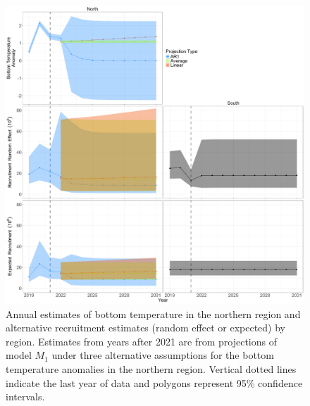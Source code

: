 \documentclass[
]{article}
\begin{document}
\begin{figure}

{\centering \includegraphics[height=0.95\textheight]{proj_ecov_Recruit_results} 

}

\caption{Annual estimates of bottom temperature in the northern region and alternative recruitment estimates (random effect or expected) by region. Estimates from years after 2021 are from projections of model $M_1$ under three alternative assumptions for the bottom temperature anomalies in the northern region. Vertical dotted lines indicate the last year of data and polygons represent 95\% confidence intervals.}\label{fig:R-BT-proj}
\end{figure}
\end{document}
